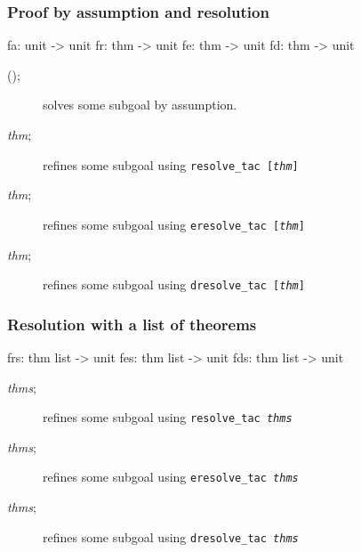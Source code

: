 \subsubsection{Proof by assumption and resolution}
\begin{ttbox} 
fa: unit -> unit
fr: thm -> unit
fe: thm -> unit
fd: thm -> unit
\end{ttbox}

\begin{description}
\item[();] 
solves some subgoal by assumption.

\item[ {\it thm};] 
refines some subgoal using \hbox{\tt resolve_tac [{\it thm}]}

\item[ {\it thm};] 
refines some subgoal using \hbox{\tt eresolve_tac [{\it thm}]}

\item[ {\it thm};] 
refines some subgoal using \hbox{\tt dresolve_tac [{\it thm}]}
\end{description}

\subsubsection{Resolution with a list of theorems}
\begin{ttbox} 
frs: thm list -> unit
fes: thm list -> unit
fds: thm list -> unit
\end{ttbox}

\begin{description}
\item[ {\it thms};] 
refines some subgoal using \hbox{\tt resolve_tac {\it thms}}

\item[ {\it thms};] 
refines some subgoal using \hbox{\tt eresolve_tac {\it thms}} 

\item[ {\it thms};] 
refines some subgoal using \hbox{\tt dresolve_tac {\it thms}} 
\end{description}

